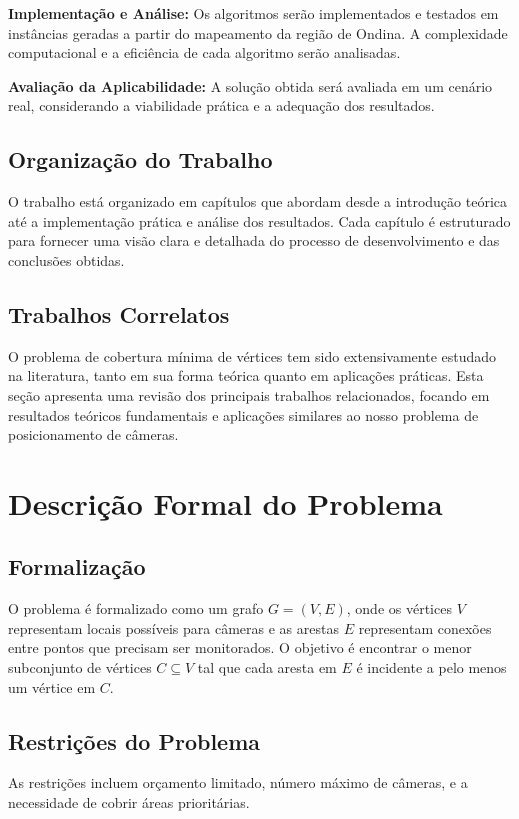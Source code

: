\documentclass[12pt, a4paper]{report}
\begin{document}
\textbf{Implementação e Análise:} Os algoritmos serão implementados e testados em instâncias geradas a partir do mapeamento da região de Ondina. A complexidade computacional e a eficiência de cada algoritmo serão analisadas.

\textbf{Avaliação da Aplicabilidade:} A solução obtida será avaliada em um cenário real, considerando a viabilidade prática e a adequação dos resultados.

\section{Organização do Trabalho}
O trabalho está organizado em capítulos que abordam desde a introdução teórica até a implementação prática e análise dos resultados. Cada capítulo é estruturado para fornecer uma visão clara e detalhada do processo de desenvolvimento e das conclusões obtidas.

\section{Trabalhos Correlatos}
O problema de cobertura mínima de vértices tem sido extensivamente estudado na literatura, tanto em sua forma teórica quanto em aplicações práticas. Esta seção apresenta uma revisão dos principais trabalhos relacionados, focando em resultados teóricos fundamentais e aplicações similares ao nosso problema de posicionamento de câmeras.

\chapter{Descrição Formal do Problema}

\section{Formalização}
O problema é formalizado como um grafo \(G = (V, E)\), onde os vértices \(V\) representam locais possíveis para câmeras e as arestas \(E\) representam conexões entre pontos que precisam ser monitorados. O objetivo é encontrar o menor subconjunto de vértices \(C \subseteq V\) tal que cada aresta em \(E\) é incidente a pelo menos um vértice em \(C\).

\section{Restrições do Problema}
As restrições incluem orçamento limitado, número máximo de câmeras, e a necessidade de cobrir áreas prioritárias.
\end{document}
